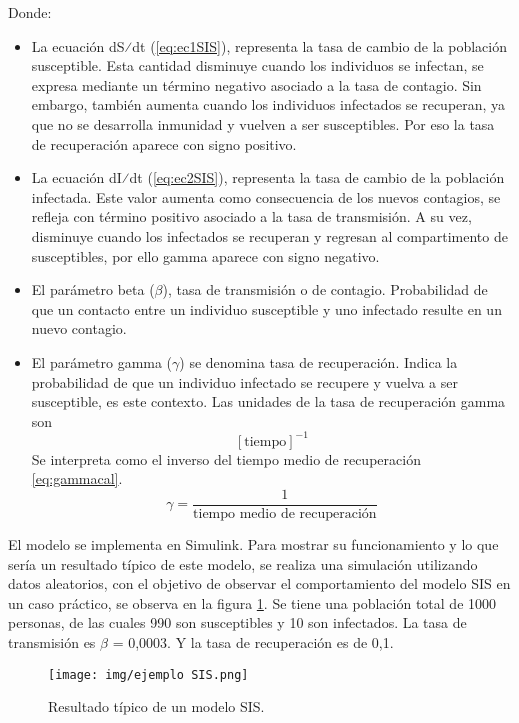 Donde:
\begin{itemize}
    \item 	La ecuación dS⁄dt (\ref{eq:ec1SIS}), representa la tasa de cambio de la población susceptible. Esta cantidad disminuye cuando los individuos se infectan, se expresa mediante un término negativo asociado a la tasa de contagio. Sin embargo, también aumenta cuando los individuos infectados se recuperan, ya que no se desarrolla inmunidad y vuelven a ser susceptibles. Por eso la tasa de recuperación aparece con signo positivo.
    \item 	La ecuación dI⁄dt (\ref{eq:ec2SIS}), representa la tasa de cambio de la población infectada. Este valor aumenta como consecuencia de los nuevos contagios, se refleja con término positivo asociado a la tasa de transmisión. A su vez, disminuye cuando los infectados se recuperan y regresan al compartimento de susceptibles, por ello gamma aparece con signo negativo.
    \item 	El parámetro beta ($\beta$), tasa de transmisión o de contagio. Probabilidad de que un contacto entre un individuo susceptible y uno infectado resulte en un nuevo contagio. 
    \item 	El parámetro gamma ($\gamma$) se denomina tasa de recuperación. Indica la probabilidad de que un individuo infectado se recupere y vuelva a ser susceptible, es este contexto. Las unidades de la tasa de recuperación gamma son \[[\text{tiempo}]^{-1}\]  Se interpreta como el inverso del tiempo medio de recuperación \eqref{eq:gammacal}.
    \begin{equation}
    \gamma = \frac{1}{\text{tiempo medio de recuperación}}
    \label{eq:gammacal}
    \end{equation}
\end{itemize}


El modelo se implementa en Simulink. Para mostrar su funcionamiento y lo que sería un resultado típico de este modelo, se realiza una simulación utilizando datos aleatorios, con el objetivo de observar el comportamiento del modelo SIS en un caso práctico, se observa en la figura \ref{fig:ejeSIS}. Se tiene una población total de 1000 personas, de las cuales 990 son susceptibles y 10 son infectados. La tasa de transmisión es $\beta$ = 0,0003. 
Y la tasa de recuperación es de 0,1.



\begin{figure}[H]
    \centering
    \texttt{[image: img/ejemplo SIS.png]}
    \caption{Resultado típico de un modelo SIS.}
    \label{fig:ejeSIS}
    
\end{figure}


